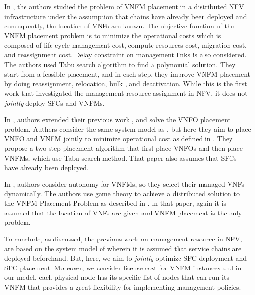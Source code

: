 In \cite{AbuLebdeh2017}, the authors studied the problem of VNFM placement in a distributed NFV infrastructure under the assumption that chains have already been deployed and consequently, the location of VNFs are known.
The objective function of the VNFM placement problem is to minimize the operational costs which is composed of life cycle management cost, compute resources cost, migration cost, and reassignment cost. Delay constraint on management links is also considered. The authors used Tabu search algorithm 
to find a polynomial solution. They start from a feasible placement, and in each step, they improve VNFM placement by doing reassignment, relocation, bulk , and deactivation. While this is the first work that investigated the management resource assignment in NFV, it does not \textit{jointly} deploy SFCs and VNFMs. 

In \cite{AbuLebdeh20172}, authors extended their previous work \cite{AbuLebdeh2017}, and solve the VNFO placement problem.
Authors consider the same system model as \cite{AbuLebdeh2017}, but here they aim to place VNFO and VNFM jointly to  minimize operational cost as defined in \cite{AbuLebdeh2017}. They propose a two step placement algorithm that first place VNFOs and then place VNFMs, which use Tabu search method. That paper also assumes that SFCs have already been deployed.

In \cite{Chiang2019}, authors consider autonomy for VNFMs, so they select their managed VNFs dynamically. The authors use game theory to achieve a distributed solution to the VNFM Placement Problem as described in \cite{AbuLebdeh2017}. In that paper, again it is assumed that the location of VNFs are given and VNFM placement is the only problem.

To conclude, as discussed, the previous work on management resource in NFV, are based on the system model of \cite{AbuLebdeh2017} wherein it is assumed that service chains are deployed beforehand. But, here, we aim to \textit{jointly} optimize SFC deployment and SFC placement. Moreover, we consider license cost for VNFM instances and in our model, each physical node has its specific list of nodes that can run its VNFM that provides a great flexibility for implementing management policies.


